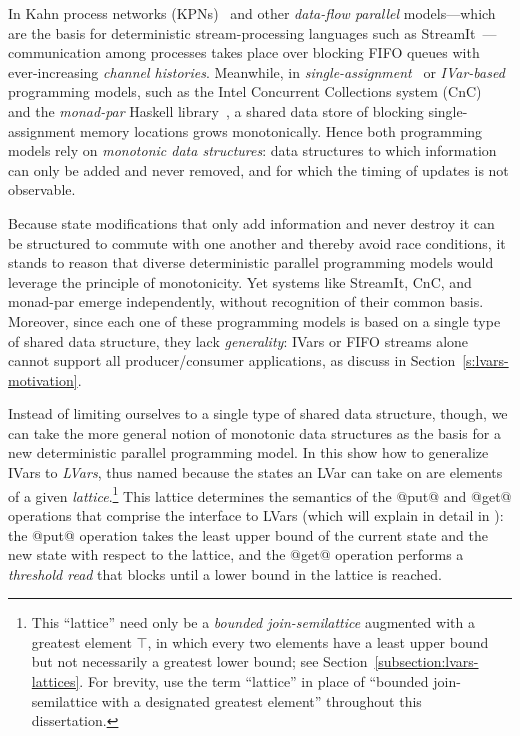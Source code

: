In Kahn process networks (KPNs)~\cite{Kahn-1974} and other
\emph{data-flow parallel} models---which are the basis for
deterministic stream-processing languages such as
StreamIt~\cite{streamit-asplos}---communication among processes takes
place over blocking FIFO queues with ever-increasing \emph{channel
  histories}.  Meanwhile, in
\emph{single-assignment}~\cite{Tesler-1968} or
\emph{IVar-based}~\cite{IStructures} programming models, such as the
Intel Concurrent Collections system (CnC)~\cite{CnC} and the
\emph{monad-par} Haskell library~\cite{monad-par}, a shared data store
of blocking single-assignment memory locations grows monotonically.
Hence both programming models rely on \emph{monotonic data
structures}: data structures to which information can only be added
and never removed, and for which the timing of updates is not
observable.

Because state modifications that only add information and never
destroy it can be structured to commute with one another and thereby
avoid race conditions, it stands to reason that diverse deterministic
parallel programming models would leverage the principle of
monotonicity.  Yet systems like StreamIt, CnC, and monad-par emerge
independently, without recognition of their common basis.  Moreover,
since each one of these programming models is based on a single type
of shared data structure, they lack \emph{generality}: IVars or FIFO
streams alone cannot support all producer/consumer applications, as 
discuss in Section~\ref{s:lvars-motivation}.

Instead of limiting ourselves to a single type of shared data
structure, though, we can take the more general notion of monotonic
data structures as the basis for a new deterministic parallel
programming model.  In this  show how to generalize IVars
to \emph{LVars}, thus named because the states an LVar can take on are
elements of a given \emph{lattice}.\footnote{This
``lattice'' need only be a \emph{bounded join-semilattice} augmented
with a greatest element $\top$, in which every two elements have a
least upper bound but not necessarily a greatest lower bound; see
Section~\ref{subsection:lvars-lattices}.  For brevity,  use the term
``lattice'' in place of ``bounded join-semilattice with a designated
greatest element'' throughout this dissertation.}  This lattice determines the semantics of the @put@ and
@get@ operations that comprise the interface to LVars (which  will
explain in detail in ): the @put@ operation
takes the least upper bound of the current state and the new state
with respect to the lattice, and the @get@ operation performs
a \emph{threshold read} that blocks until a lower bound in the lattice
is reached.

